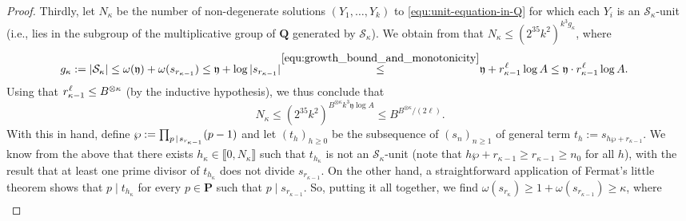\documentclass[reqno]{amsart}
\theoremstyle{remark}
\providecommand\llb{\llbracket}
\providecommand\rrb{\rrbracket}
\newcommand{\fixed}[2][1]{%
  \begingroup
  \spaceskip=#1\fontdimen2\font minus \fontdimen4\font
  \xspaceskip=0pt\relax
  #2%
  \endgroup
}
\begin{document}
\begin{proof}
Thirdly, let $N_\kappa$ be the number of non-degenerate solutions $(Y_1, \ldots, Y_k)$ to \eqref{equ:unit-equation-in-Q} for which each $Y_i$ is an $\mathcal S_\kappa$-unit (i.e., lies in the subgroup of the multiplicative group of $\mathbf Q$ generated by $\mathcal S_\kappa$). We obtain from \cite[Theorem 3]{Ev95} that $N_\kappa \le (2^{35} k^2)^{k^3 g_\kappa}$, where
\begin{equation*}
\begin{split}
g_\kappa := |\mathcal S_\kappa| & \le \omega(\mathfrak y) + \omega(s_{r_{\kappa-1}}) \le \mathfrak y + \log |s_{r_{\kappa-1}}|
\fixed[-0.65]{\text{ }}\stackrel{\eqref{equ:growth_bound_and_monotonicity}}{\le}\fixed[-0.65]{\text{ }}
\mathfrak y + r_{\kappa-1}^{\fixed[0.15]{\text{ }}\ell} \log A \le \mathfrak y \cdot r_{\kappa-1}^{\fixed[0.15]{\text{ }}\ell} \log A.
\end{split}
\end{equation*}
%
Using that $r_{\kappa-1}^{\fixed[0.15]{\text{ }}\ell} \le B^{\otimes \kappa}$ (by the inductive hypothesis), we thus conclude that
\begin{equation}
\label{equ:bound-on-number-of-nondegenerate-solutions-to-S-unit-equ}
N_{\kappa }\le (2^{35} k^{2})^{B^{\otimes \kappa } k^{3} \mathfrak{y}
 \log A} \le B
^{B^{\otimes \kappa }/(2\ell )}.
\end{equation}
With this in hand, define $\wp := \prod_{p \fixed[0.35]{\text{ }}\mid \fixed[0.3]{\text{ }} s_{r_{\kappa-1}}} (p-1)$ and let $(t_h)_{h \ge 0}$ be the subsequence of $(s_n)_{n \ge 1}$ of general term $t_h := s_{h\wp+r_{\kappa-1}}$. We know from the above that there exists $h_\kappa \in \llb 0, N_\kappa \rrb$ such that $t_{h_\kappa}$ is not an $\mathcal S_\kappa$-unit (note that $h\wp + r_{\kappa-1} \ge r_{\kappa-1} \ge n_0$ for all $h$), with the result that at least one prime divisor of $t_{h_\kappa}$ does not divide $s_{r_{\kappa-1}}$. On the other hand, a straightforward application of Fermat's little theorem shows that $p \mid t_{h_\kappa}$ for every $p \in \mathbf P$ such that $p \mid s_{r_{\kappa-1}}$. So, putting it all together, we find $\omega(s_{r_\kappa}) \ge 1 + \omega(s_{r_{\kappa-1}}) \ge \kappa$, where
%
\begin{equation*}
\label{equ:inductive-step-ineq}
\begin{split}

\end{split}
\end{equation*}
\end{proof}
\end{document}
